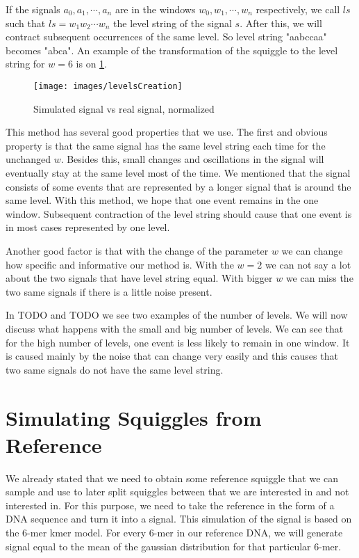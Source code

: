 If the signals $a_0, a_1, \cdots, a_n$ are in the windows $w_0, w_1, \cdots ,w_n$
respectively, we call $ls$ such that $ls=w_1w_2\cdots w_n$ the level string of the
signal $s$. After this, we will contract subsequent occurrences of the same level.
So level string "aabccaa" becomes "abca". An example of the transformation of the squiggle
to the level string for $w=6$ is on \ref{obr:levelsCreation}.

\begin{figure}
\centerline{\texttt{[image: images/levelsCreation]}}
\caption[Hehe]{Simulated signal vs real signal, normalized}
\label{obr:levelsCreation}
\end{figure}

This method has several good properties that we use. The first and obvious
property is that the same signal has the same level string each time for the
unchanged $w$. Besides this, small changes and oscillations in the signal will
eventually stay at the same level most of the time. We mentioned that the signal
consists of some events that are represented by a longer signal that is around the same level.
With this method, we hope that one event remains in the one window. Subsequent
contraction of the level string should cause that one event is in most cases represented by
one level.

Another good factor is that with the change of the parameter $w$ we can change how specific
and informative our method is. With the $w=2$ we can not say a lot about the two signals
that have level string equal. With bigger $w$ we can miss the two same signals
if there is a little noise present.

In TODO and TODO we see two examples of the number of levels. We will now discuss
what happens with the small and big number of levels. We can see that for the high
number of levels, one event is less likely to remain in one window. It is caused
mainly by the noise that can change very easily and this causes that two same signals
do not have the same level string.

\section{Simulating Squiggles from Reference}

We already stated that we need to obtain some reference squiggle that we
can sample and use to later split squiggles between that we are interested in and not
interested in. For this purpose, we need to take the reference in the form of a DNA sequence
and turn it into a signal. This simulation of the signal is based on the 6-mer kmer model.
For every 6-mer in our reference DNA, we will generate signal equal to the mean
of the gaussian distribution for that particular 6-mer.

